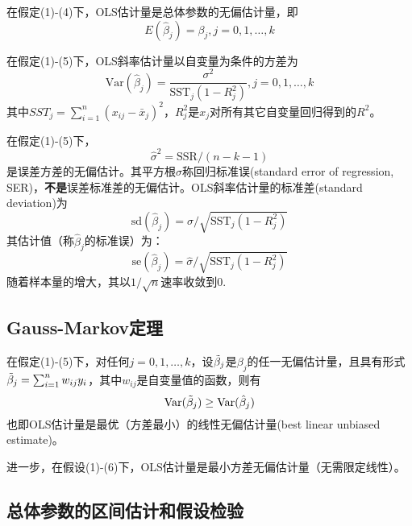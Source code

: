 \par 在假定(1)-(4)下，OLS估计量是总体参数的无偏估计量，即
\begin{equation}
    E(\hat{\beta}_j)=\beta_j, j=0,1,\dots,k
\end{equation}
\par 在假定(1)-(5)下，OLS斜率估计量以自变量为条件的方差为
\begin{equation}
    \text{Var}(\hat{\beta}_j)=\frac{\sigma^2}{\text{SST}_j (1-R_j^2)}, j=0,1,\dots,k \label{eq:Variance}
\end{equation}
其中$SST_j=\sum_{i=1}^n (x_{ij}-\bar{x}_j)^2$，$R_j^2$是$x_j$对所有其它自变量回归得到的$R^2$。
\par 在假定(1)-(5)下，
\begin{equation}
    \hat{\sigma}^2=\text{SSR}/(n-k-1)
\end{equation}
是误差方差的无偏估计。其平方根$\hat{\sigma}$称回归标准误(standard error of regression, SER)，\textbf{不是}误差标准差的无偏估计。OLS斜率估计量的标准差(standard deviation)为
\begin{equation}
    \text{sd}(\hat{\beta}_j)=\sigma/\sqrt{\text{SST}_j(1-R_j^2)}
\end{equation}
其估计值（称$\hat{\beta}_j$的标准误）为：
\begin{equation}
    \text{se}(\hat{\beta}_j)=\hat{\sigma}/\sqrt{\text{SST}_j(1-R_j^2)}
\end{equation}
随着样本量的增大，其以$1/\sqrt{n}$速率收敛到0. 

\subsection{Gauss-Markov定理}

\par 在假定(1)-(5)下，对任何$j=0,1,\dots,k$，设$\Tilde{\beta}_j$是$\beta_j$的任一无偏估计量，且具有形式$\Tilde{\beta}_j=\sum_{i=1}^n w_{ij}y_i$，其中$w_{ij}$是自变量值的函数，则有
\begin{equation}
    \text{Var}(\Tilde{\beta}_j)\ge \text{Var}(\hat{\beta}_j)
\end{equation}
也即OLS估计量是最优（方差最小）的线性无偏估计量(best linear unbiased estimate)。
\par 进一步，在假设(1)-(6)下，OLS估计量是最小方差无偏估计量（无需限定线性）。


\subsection{总体参数的区间估计和假设检验}

